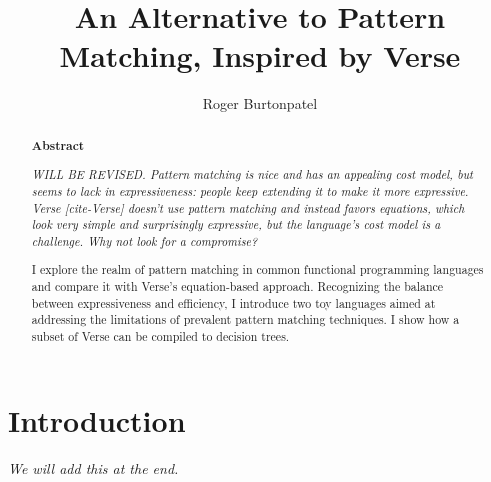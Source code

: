 \documentclass[manuscript,screen,review, 12pt]{acmart}
\begin{document}
\title{An Alternative to Pattern Matching, Inspired by Verse}

\author{Roger Burtonpatel}



\renewcommand{\shortauthors}{Burtonpatel et al.}

\begin{abstract}
    \bf{Abstract}

    \it{WILL BE REVISED.}
  Pattern matching is nice and has an appealing cost model, but seems to lack in
  expressiveness: people keep extending it to make it more expressive. Verse
  [cite-Verse] doesn't use pattern matching and instead favors equations, which
  look very simple and surprisingly expressive, but the language's cost model is
  a challenge. Why not look for a compromise? 
  

  I explore the realm of pattern matching in common functional programming
  languages and compare it with Verse's equation-based approach. Recognizing the
  balance between expressiveness and efficiency, I introduce two toy languages
  aimed at addressing the limitations of prevalent pattern matching techniques.
  I show how a subset of Verse can be compiled to decision trees. 

  \end{abstract}

\maketitle

\section{Introduction}
\it{We will add this at the end.}
\end{document}

